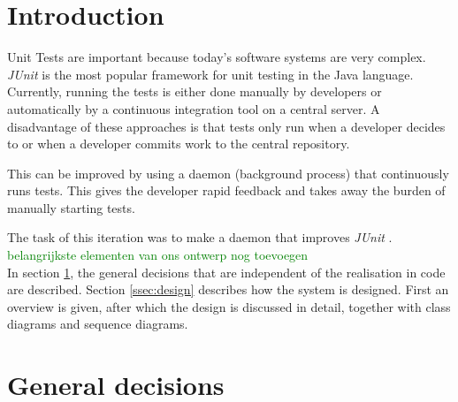 \documentclass[i2]{oss}
\newcommand{\junit}{\emph{JUnit }}
\newcommand{\comment}[1]{{\huge \textcolor{green}{#1}}\\}
\begin{document}

\maketitlepage
\newpage
\tableofcontents
\pagebreak




\section*{Introduction}
\label{ssec:introduction}

Unit Tests are important because today's software systems are very 
complex.
\junit is the most popular framework for unit testing in the Java 
language.
Currently, running the tests is either done manually by developers or
automatically by a continuous integration tool on a central server.
A disadvantage of these approaches is that tests only run when a 
developer decides to or when a developer commits work to the central 
repository.

This can be improved by using a daemon (background process) that continuously runs tests.
This gives the developer rapid feedback and takes away the burden of manually starting tests.

The task of this iteration was to make a daemon that improves \junit.
\comment{belangrijkste elementen van ons ontwerp nog toevoegen}

In section \ref{ssec:general-decisions}, the general decisions that are independent of the realisation in code are described. Section \ref{ssec:design} describes how the system is designed. First an overview is given, after which the design is discussed in detail, together with class diagrams and sequence diagrams.

\section{General decisions}
\label{ssec:general-decisions}
\end{document}
